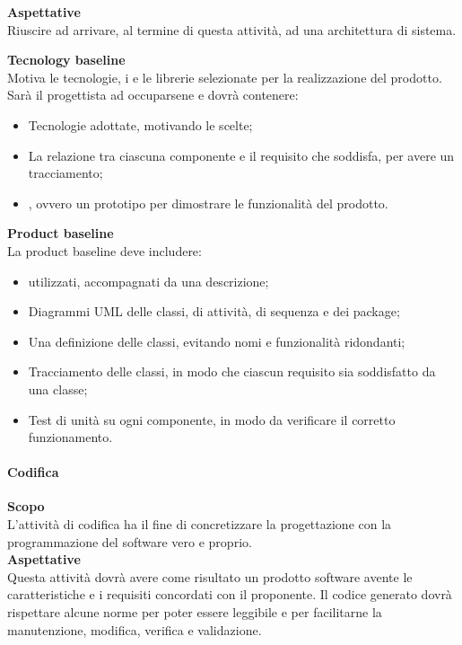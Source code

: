 \textbf{Aspettative} \mbox{} \\
Riuscire ad arrivare, al termine di questa attività, ad una architettura di sistema.\\ \mbox{}

\textbf{Tecnology baseline} \mbox{} \\
Motiva le tecnologie, i  e le librerie selezionate per la realizzazione del prodotto. Sarà il progettista ad occuparsene e dovrà contenere:
\begin{itemize}
\item Tecnologie adottate, motivando le scelte;
\item La relazione tra ciascuna componente e il requisito che soddisfa, per avere un tracciamento;  
\item {}, ovvero un prototipo per dimostrare le funzionalità del prodotto.
\end{itemize}

\mbox{}

\textbf{Product baseline} \mbox{} \\
La product baseline deve includere:
\begin{itemize}
	\item {} utilizzati, accompagnati da una descrizione;
	\item Diagrammi UML delle classi, di attività, di sequenza e dei package;
	\item Una definizione delle classi, evitando nomi e funzionalità ridondanti;
	\item Tracciamento delle classi, in modo che ciascun requisito sia soddisfatto da una classe;
	\item Test di unità su ogni componente, in modo da verificare il corretto funzionamento.
\end{itemize}
\paragraph{Codifica}

\textbf{Scopo}  \mbox{} \\
L'attività di codifica ha il fine di concretizzare la progettazione con la programmazione del software vero e proprio.\\

\textbf{Aspettative} \mbox{} \\
Questa attività dovrà avere come risultato un prodotto software avente le caratteristiche e i requisiti concordati con il proponente. Il codice generato dovrà rispettare alcune norme per poter essere leggibile e per facilitarne la  manutenzione, modifica, verifica e validazione.\\

